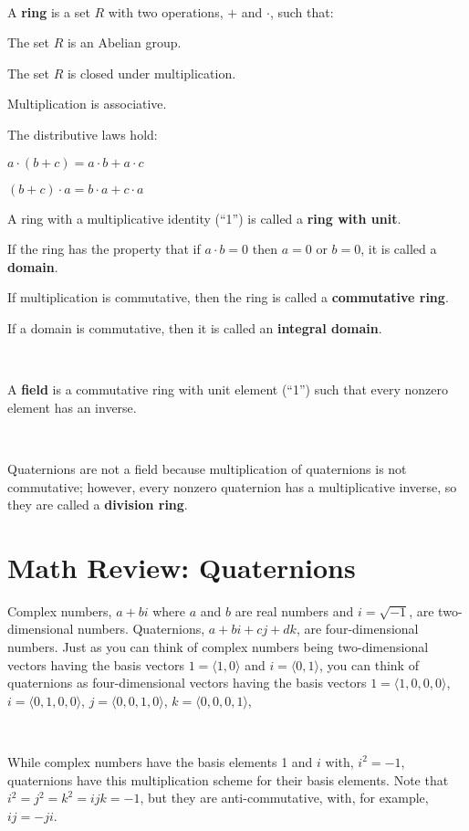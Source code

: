 \documentclass[12pt]{article}
\begin{document}
\begin{spacing}{1.2}
\

A {\bf ring} is a set $R$ with two operations, $+$ and $\cdot$, such that:

\qquad The set $R$ is an Abelian group.  

\qquad The set $R$ is closed under multiplication.

\qquad Multiplication is associative.  

\qquad The distributive laws hold:

\qquad \qquad $a \cdot (b+c) = a \cdot b + a \cdot c$

\qquad \qquad $(b+c) \cdot a = b \cdot a + c \cdot a$

A ring with a multiplicative identity (``1'') is called a {\bf ring with unit}.

If the ring has the property that if $a\cdot b = 0$ then $a=0$ or $b=0$, it is called a {\bf domain}.

If multiplication is commutative, then the ring is called a {\bf commutative ring}.

If a domain is commutative, then it is called an {\bf integral domain}.

\

A {\bf field} is a commutative ring with unit element (``1'') such that every nonzero element has an inverse.  

\

Quaternions are not a field because multiplication of quaternions is not commutative; however, every nonzero quaternion has a multiplicative inverse, so they are called a {\bf division ring}.

\section{Math Review:  Quaternions}

Complex numbers, $a+bi$ where $a$ and $b$ are real numbers and $i = \sqrt{-1}$, are two-dimensional numbers.  Quaternions, $a + bi + cj + dk$, are four-dimensional numbers.  Just as you can think of complex numbers being two-dimensional vectors having the basis vectors $1 = \langle 1,0 \rangle$ and $i = \langle 0,1 \rangle$, you can think of quaternions as four-dimensional vectors having the basis vectors 
$1 = \langle 1,0,0,0 \rangle$, 
$i = \langle 0,1,0,0 \rangle$, 
$j = \langle 0,0,1,0 \rangle$, 
$k = \langle 0,0,0,1 \rangle$, 

\

While complex numbers have the basis elements 1 and $i$ with, $i^2 = -1$, quaternions have this multiplication scheme for their basis elements.  Note that $i^2 = j^2 = k^2 = ijk = -1$, but they are anti-commutative, with, for example, $ij = -ji$.


\end{spacing}
\end{document}
